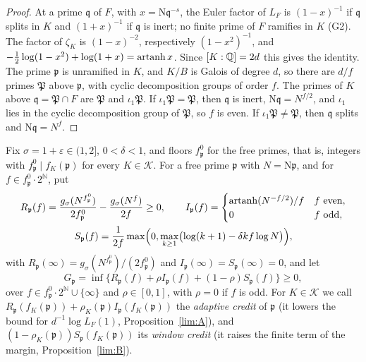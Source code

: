 \begin{proof}
At a prime $\mathfrak q$ of $F$, with $x=\mathrm N\mathfrak q^{-s}$, the Euler
factor of $L_F$ is $(1-x)^{-1}$ if $\mathfrak q$ splits in $K$ and
$(1+x)^{-1}$ if $\mathfrak q$ is inert; no finite prime of $F$ ramifies in $K$
(G2). The factor of $\zeta_K$ is $(1-x)^{-2}$, respectively
$(1-x^2)^{-1}$, and $-\frac12\log(1-x^2)+\log(1+x)=\operatorname{artanh} x$. Since
$[K:\mathbb Q]=2d$ this gives the identity. The prime $\mathfrak p$ is unramified in
$K$, and $K/B$ is Galois of degree $d$, so there are $d/f$ primes $\mathfrak
P$ above $\mathfrak p$, with cyclic decomposition groups of order $f$. The
primes of $K$ above $\mathfrak q=\mathfrak P\cap F$ are $\mathfrak P$ and
$\iota_1\mathfrak P$. If $\iota_1\mathfrak P=\mathfrak P$, then $\mathfrak q$
is inert, $\mathrm N\mathfrak q=N^{f/2}$, and $\iota_1$ lies in the cyclic
decomposition group of $\mathfrak P$, so $f$ is even. If
$\iota_1\mathfrak P\ne\mathfrak P$, then $\mathfrak q$ splits and
$\mathrm N\mathfrak q=N^f$.
\end{proof}

\begin{definition}\label{lim:credits}
Fix $\sigma=1+\varepsilon\in(1,2]$, $0<\delta<1$, and floors $f^0_{\mathfrak
p}$ for the free primes, that is, integers with $f^0_{\mathfrak p}\mid
f_K(\mathfrak p)$ for every $K\in\mathcal K$. For a free prime $\mathfrak p$
with $N=\mathrm N\mathfrak p$, and for $f\in f^0_{\mathfrak p}\cdot2^{\mathbb
N}$, put
\[
 \begin{gathered}
 R_{\mathfrak p}(f)=\frac{g_\sigma(N^{f^0_{\mathfrak p}})}{2f^0_{\mathfrak p}}
 -\frac{g_\sigma(N^f)}{2f}\ge0,
 \qquad
 I_{\mathfrak p}(f)=\begin{cases}\operatorname{artanh}(N^{-f/2})/f&f\text{ even},\\0&f\text{ odd},\end{cases}\\
 S_{\mathfrak p}(f)=\frac1{2f}\max\Bigl(0,\max_{k\ge1}\bigl(\log(k+1)-\delta kf\log N\bigr)\Bigr),
 \end{gathered}
\]
with $R_{\mathfrak p}(\infty)=g_\sigma(N^{f^0_{\mathfrak p}})/(2f^0_{\mathfrak
p})$ and $I_{\mathfrak p}(\infty)=S_{\mathfrak p}(\infty)=0$, and let
\[
 G_{\mathfrak p}=\inf\bigl\{R_{\mathfrak p}(f)+\rho I_{\mathfrak p}(f)
 +(1-\rho)S_{\mathfrak p}(f)\bigr\}\ge0,
\]
over $f\in f^0_{\mathfrak p}\cdot2^{\mathbb N}\cup\{\infty\}$ and
$\rho\in[0,1]$, with $\rho=0$ if $f$ is odd. For $K\in\mathcal K$ we call
$R_{\mathfrak p}(f_K(\mathfrak p))+\rho_K(\mathfrak p)I_{\mathfrak
p}(f_K(\mathfrak p))$ the \emph{adaptive credit} of $\mathfrak p$ (it lowers
the bound for $d^{-1}\log L_F(1)$, Proposition~\ref{lim:A}), and
$(1-\rho_K(\mathfrak p))S_{\mathfrak p}(f_K(\mathfrak p))$ its \emph{window
credit} (it raises the finite term of the margin, Proposition~\ref{lim:B}).
\end{definition}

